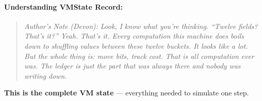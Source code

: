 \paragraph{Understanding VMState Record:}

\begin{quote}
\textit{Author's Note (Devon): Look, I know what you're thinking. ``Twelve fields? That's it?'' Yeah. That's it. Every computation this machine does boils down to shuffling values between these twelve buckets. It looks like a lot. But the whole thing is: move bits, track cost. That is all computation ever was. The ledger is just the part that was always there and nobody was writing down.}
\end{quote}

\textbf{This is the complete VM state} --- everything needed to simulate one step.

